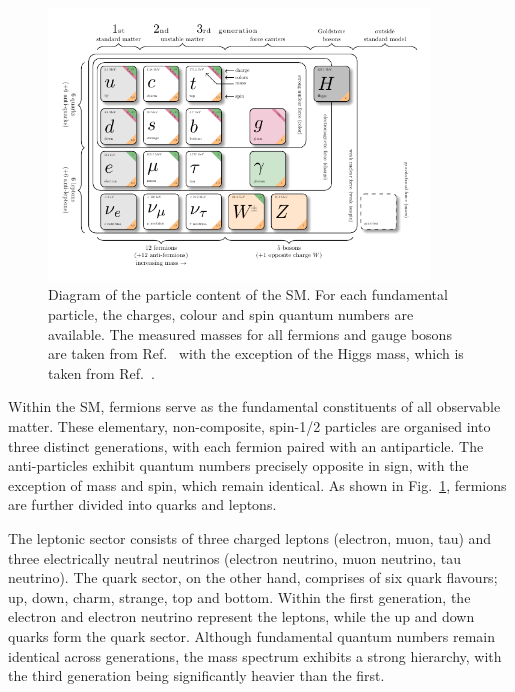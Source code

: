 \begin{figure}[ht]
\centering
\includegraphics[width= 0.9\textwidth]{Figures/Introduction/Particles.pdf}
\caption{Diagram of the particle content of the SM. For each fundamental particle, the charges, colour and spin quantum numbers are available. The measured masses for all fermions and gauge bosons are taken from Ref.~\cite{ParticleMasses} with the exception of the Higgs mass, which is taken from Ref.~\cite{Higgs_Mass}.}
\label{Figure:Introduction_1}
\end{figure}

Within the SM, fermions serve as the fundamental constituents of all observable matter. These elementary, non-composite, spin-1/2 particles are organised into three distinct generations, with each fermion paired with an antiparticle. The anti-particles exhibit quantum numbers precisely opposite in sign, with the exception of mass and spin, which remain identical. As shown in Fig.~\ref{Figure:Introduction_1}, fermions are further divided into quarks and leptons. 

The leptonic sector consists of three charged leptons (electron, muon, tau) and three electrically neutral neutrinos (electron neutrino, muon neutrino, tau neutrino). The quark sector, on the other hand, comprises of six quark flavours; up, down, charm, strange, top and bottom. Within the first generation, the electron and electron neutrino represent the leptons, while the up and down quarks form the quark sector. Although fundamental quantum numbers remain identical across generations, the mass spectrum exhibits a strong hierarchy, with the third generation being significantly heavier than the first.

